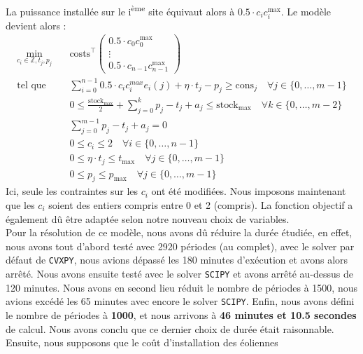 \documentclass{article}
\begin{document}
\noindent La puissance installée sur le i\textsuperscript{ème} site équivaut alors à $0.5 \cdot c_ic_i^\mathrm{max}$. Le modèle devient alors :
\begin{align}
    \min_{c_{i} \in \mathbb{Z},t_j,p_j} \quad &\mathrm{costs}^\intercal 
    \begin{pmatrix}
        0.5 \cdot c_0c_0^\mathrm{max}\\
        \vdots\\
        0.5 \cdot c_{n-1}c_{n-1}^\mathrm{max}
    \end{pmatrix} \nonumber\\
    \textrm{tel que} \quad & \sum_{i=0}^{n-1} 0.5 \cdot c_ic_i^{max} e_i(j) + \eta \cdot t_j - p_j \ge \mathrm{cons}_j \quad \forall j \in  \{ 0, \ldots, m-1 \}\label{eq:5_contr1}\\
    & 0 \le \frac{\mathrm{stock}_\mathrm{max}}{2}  + \sum_{j=0}^{k} p_j - t_j + a_j \le  \mathrm{stock}_\mathrm{max} \quad \forall k \in \{ 0, \ldots, m-2 \}\label{eq:5_contr2}\\
    & \sum_{j=0}^{m-1} p_j - t_j + a_j = 0 \label{eq:5_contr3}\\
    & 0\le c_i \le 2 \quad \forall i \in  \{ 0, \ldots, n-1 \} \label{eq:5_contr4}  \\
    & 0 \le \eta \cdot t_j \le  t_\mathrm{max} \quad \forall j \in  \{ 0, \ldots, m-1 \} \label{eq:5_contr5}\\
    & 0 \le p_j \le  p_\mathrm{max} \quad \forall j \in  \{ 0, \ldots, m-1 \} \label{eq:5_contr6} 
\end{align}
Ici, seule les contraintes sur les $c_i$ ont été modifiées. Nous imposons maintenant que les $c_i$ soient des entiers compris entre 0 et 2 (compris).
La fonction objectif a également dû être adaptée selon notre nouveau choix de variables.\\ 
Pour la résolution de ce modèle, nous avons dû réduire la durée étudiée, en effet, nous avons tout d'abord
testé avec 2920 périodes (au complet), avec le solver par défaut de \verb|CVXPY|, nous avions dépassé les 180 minutes
d'exécution et avons alors arrêté. Nous avons ensuite testé avec le solver \verb|SCIPY| et avons arrêté au-dessus de 120
minutes. Nous avons en second lieu réduit le nombre de périodes à 1500, nous avions excédé les 65
minutes avec encore le solver \verb|SCIPY|. Enfin, nous avons défini le nombre de périodes à \textbf{1000}, et nous arrivons
à \textbf{46 minutes et 10.5 secondes} de calcul. Nous avons conclu que ce dernier choix de durée était raisonnable.
Ensuite, nous supposons que le coût d'installation des éoliennes
\end{document}
